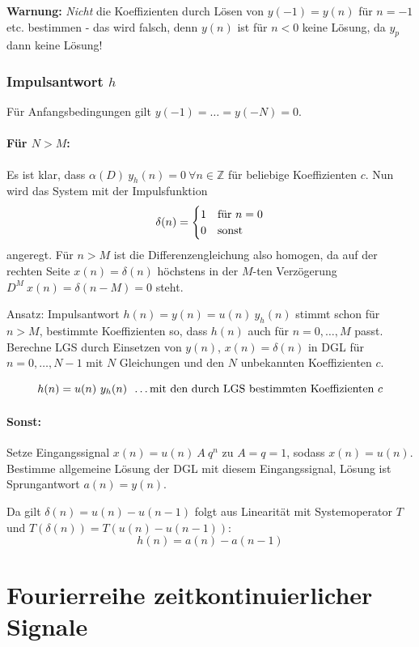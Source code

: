 \documentclass[10pt,a4paper]{article}
\newcommand{\fancythumb}[2]{
	\addthumb{#1}{\large\sffamily\textbf{\space\space#1\vspace{5pt}}}{white}{#2}
}
\begin{document}
\vspace{.5em}
\raggedright
\textbf{Warnung:} \textit{Nicht} die Koeffizienten durch Lösen von $y(-1) = y(n)$ für $n = -1$ etc. bestimmen - das wird falsch, denn $y(n)$ ist für $n < 0$ keine Lösung, da $y_p$ dann keine Lösung!

\subsubsection*{Impulsantwort $h$}
Für Anfangsbedingungen gilt $y(-1) = … = y(-N) = 0$.
\paragraph{Für $N > M$:} Es ist klar, dass $\alpha(D) ~ y_h(n) = 0 ~ \forall n \in \mathbb Z$ für beliebige Koeffizienten $c$. Nun wird das System mit der Impulsfunktion 
\[
	\delta(n) =
	\begin{cases}
		1 & \textnormal{für } n = 0 \\
		0 & \textnormal{sonst}
	\end{cases}
\]
angeregt. Für $n > M$ ist die Differenzengleichung also homogen, da auf der rechten Seite $x(n) = \delta(n)$ höchstens in der $M$-ten Verzögerung $D^M ~ x(n) = \delta(n - M) = 0$ steht.

\vspace{.5em}
Ansatz: Impulsantwort $h(n) = y(n) = u(n) ~ y_h(n)$ stimmt schon für $n > M$, bestimmte Koeffizienten so, dass $h(n)$ auch für $n = 0, …, M$ passt. Berechne LGS durch Einsetzen von $y(n)$, $x(n) = \delta(n)$ in DGL für $n = 0, …, N - 1$ mit $N$ Gleichungen und den $N$ unbekannten Koeffizienten $c$.

\[
	h(n) = u(n) ~ y_h(n) ~~ \textnormal{…mit den durch LGS bestimmten Koeffizienten $c$}
\]

\paragraph{Sonst:} Setze Eingangssignal $x(n) = u(n) ~ A ~ q^n$ zu $A = q = 1$, sodass $x(n) = u(n)$. Bestimme allgemeine Lösung der DGL mit diesem Eingangssignal, Lösung ist Sprungantwort $a(n) = y(n)$.

\vspace{.5em}
Da gilt $\delta(n) = u(n) - u(n - 1)$ folgt aus Linearität mit Systemoperator $T$ und $T(\delta(n)) = T(u(n) - u(n - 1))$:
\[
	h(n) = a(n) - a(n-1)
\]

\section*{Fourierreihe zeitkontinuierlicher Signale}
\fancythumb{FR}{blue}
\end{document}
